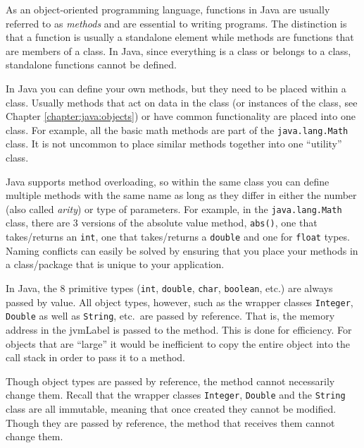 

As an object-oriented programming language, functions in
Java are usually referred to as \emph{methods} and are 
essential to writing programs.  The distinction is that a 
function is usually a standalone element while methods
are functions that are members of a class.  In Java, since
everything is a class or belongs to a class, standalone
functions cannot be defined.

In Java you can define your own methods, but they
need to be placed within a class.  Usually methods that
act on data in the class (or instances of the class, see
Chapter \ref{chapter:java:objects}) or have common
functionality are placed into one class.  For example, all
the basic math methods are part of the 
\texttt{java.lang.Math} class.  It is not uncommon
to place similar methods together into one ``utility'' class.

Java supports  
method overloading, so within the same 
class you can define multiple methods with the same name
as long as they differ in either the number (also called \emph{arity})
or type of 
parameters.  For example, in the \texttt{java.lang.Math}
class, there are 3 versions of the absolute value method,
\texttt{abs()}, one that takes/returns an 
\texttt{int}, one that takes/returns a \texttt{double}
and one for \texttt{float} types.  Naming conflicts
can easily be solved by ensuring that you place your 
methods in a class/package that is unique to your application.

In Java, the 8 primitive types (\texttt{int}, \texttt{double},
\texttt{char}, \texttt{boolean}, etc.) are always
 passed by value.  All object types, however, such as the 
wrapper classes \texttt{Integer}, \texttt{Double}
as well as \texttt{String}, etc.\ are  
passed by reference.  That is, the memory address in the \gls{jvmLabel}
is passed to the method.  This is done for efficiency.  For 
objects that are ``large'' it would be inefficient to copy the
entire object into the call stack in order to pass it to a
method.  

Though object types are passed by reference, the
method cannot necessarily change them.  Recall that the wrapper
classes \texttt{Integer}, \texttt{Double} and
the \texttt{String} class are all 
\gls{immutable}, meaning
that once created they cannot be modified.  Though
they are passed by reference, the method that receives them
cannot change them.

